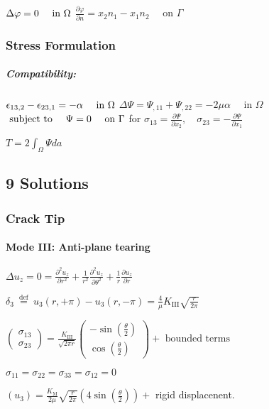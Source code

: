\(\Delta \varphi=0 \quad \text { in } \Omega\\\)
\(\frac{\partial \varphi}{\partial n}=x_{2} n_{1}-x_{1} n_{2} \quad \text { on } \Gamma\)

\hypertarget{stress-formulation}{%
\subsubsection{Stress Formulation}\label{stress-formulation}}

\hypertarget{compatibility-2}{%
\subparagraph{Compatibility:}\label{compatibility-2}}

\(\epsilon_{13,2}-\epsilon_{23,1}=-\alpha \quad \text { in } \Omega\\\)
\(\Delta \Psi=\Psi_{, 11}+\Psi_{, 22} = -2 \mu \alpha \quad \text{ in  } \Omega\)
\(\text { subject to } \quad \Psi=0 \quad \text { on } \Gamma\\\) for
\(\sigma_{13}=\frac{\partial \Psi}{\partial x_{2}}, \quad \sigma_{23}=-\frac{\partial \Psi}{\partial x_{1}}\)

\(T=2 \int_{\Omega} \Psi d a\)

\hypertarget{solutions}{%
\subsection{9 Solutions}\label{solutions}}

\hypertarget{crack-tip}{%
\subsubsection{Crack Tip}\label{crack-tip}}

\hypertarget{mode-iii-anti-plane-tearing}{%
\paragraph{Mode III: Anti-plane
tearing}\label{mode-iii-anti-plane-tearing}}

\(\Delta u_{z}=0 = \frac{\partial^{2} u_{z}}{\partial r^{2}}+\frac{1}{r^{2}} \frac{\partial^{2} u_{z}}{\partial \theta^{2}}+\frac{1}{r} \frac{\partial u_{z}}{\partial r}\)

\(\delta_{3} \stackrel{\text { def }}{=} u_{3}(r,+\pi)-u_{3}(r,-\pi)=\frac{4}{\mu} K_{\mathrm{III}} \sqrt{\frac{r}{2 \pi}}\)

\(\left(\begin{array}{c}{\sigma_{13}} \\ {\sigma_{23}}\end{array}\right)=\frac{K_{\mathrm{III}}}{\sqrt{2 \pi r}}\left(\begin{array}{c}{-\sin \left(\frac{\theta}{2}\right)} \\ {\cos \left(\frac{\theta}{2}\right)}\end{array}\right)+\text{ bounded terms}\)

\(\sigma_{11}=\sigma_{22}=\sigma_{33}=\sigma_{12}=0\)

\(\left(u_{3}\right)=\frac{K_{\mathrm{M}}}{2 \mu} \sqrt{\frac{r}{2 \pi}}\left(4 \sin \left(\frac{\theta}{2}\right)\right)+\)
rigid displacenent.
